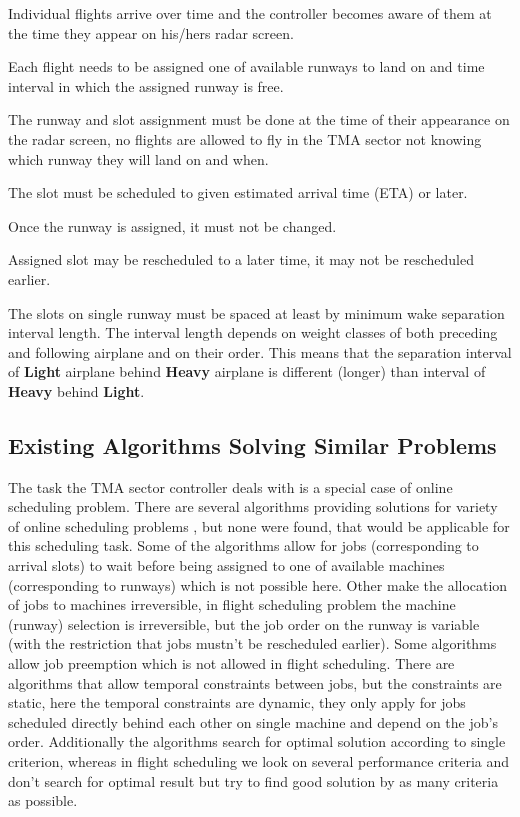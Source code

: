 \bitem
\item Individual flights arrive over time and the controller becomes aware of them at the time they appear on his/hers radar screen.
\item Each flight needs to be assigned one of available runways to land on and time interval in which the assigned runway is free.
\item The runway and slot assignment must be done at the time of their appearance on the radar screen, no flights are allowed to fly in the TMA sector not knowing which runway they will land on and when.
\item The slot must be scheduled to given estimated arrival time (ETA) or later.
\item Once the runway is assigned, it must not be changed.
\item Assigned slot may be rescheduled to a later time, it may not be rescheduled earlier.
\item The slots on single runway must be spaced at least by minimum wake separation interval length. The interval length depends on weight classes of both preceding and following airplane and on their order. This means that the separation interval of \textbf{Light} airplane behind \textbf{Heavy} airplane is different (longer) than interval of \textbf{Heavy} behind \textbf{Light}.
\eitem

\subsection{Existing Algorithms Solving Similar Problems}

The task the TMA sector controller deals with is a special case of online scheduling problem. There are several algorithms providing solutions for variety of online scheduling problems \cite{scheduling}, but none were found, that would be applicable for this scheduling task. Some of the algorithms allow for jobs (corresponding to arrival slots) to wait before being assigned to one of available machines (corresponding to runways) which is not possible here. Other make the allocation of jobs to machines irreversible, in flight scheduling problem the machine (runway) selection is irreversible, but the job order on the runway is variable (with the restriction that jobs mustn't be rescheduled earlier). Some algorithms allow job preemption which is not allowed in flight scheduling. There are algorithms that allow temporal constraints between jobs, but the constraints are static, here the temporal constraints are dynamic, they only apply for jobs scheduled directly behind each other on single machine and depend on the job's order. Additionally the algorithms search for optimal solution according to single criterion, whereas in flight scheduling we look on several performance criteria and don't search for optimal result but try to find good solution by as many criteria as possible.

